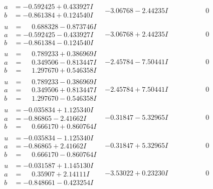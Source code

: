 \documentclass[1p]{elsarticle_modified}
\theoremstyle{definition}
\begin{document}
$$\begin{array}{c|c|c}
\begin{aligned}
a &= -0.592425 + 0.433927 I \\
b &= -0.861384 + 0.124540 I\end{aligned}
 & -3.06768 - 2.44235 I & \phantom{-0.000000 } 0 \\ \hline\begin{aligned}
u &= \phantom{-}0.688328 - 0.873746 I \\
a &= -0.592425 - 0.433927 I \\
b &= -0.861384 - 0.124540 I\end{aligned}
 & -3.06768 + 2.44235 I & \phantom{-0.000000 } 0 \\ \hline\begin{aligned}
u &= \phantom{-}0.789233 + 0.386969 I \\
a &= \phantom{-}0.349506 - 0.813447 I \\
b &= \phantom{-}1.297670 + 0.546358 I\end{aligned}
 & -2.45784 - 7.50441 I & \phantom{-0.000000 } 0 \\ \hline\begin{aligned}
u &= \phantom{-}0.789233 - 0.386969 I \\
a &= \phantom{-}0.349506 + 0.813447 I \\
b &= \phantom{-}1.297670 - 0.546358 I\end{aligned}
 & -2.45784 + 7.50441 I & \phantom{-0.000000 } 0 \\ \hline\begin{aligned}
u &= -0.035834 + 1.125340 I \\
a &= -0.86865 - 2.41662 I \\
b &= \phantom{-}0.666170 + 0.860764 I\end{aligned}
 & -0.31847 - 5.32965 I & \phantom{-0.000000 } 0 \\ \hline\begin{aligned}
u &= -0.035834 - 1.125340 I \\
a &= -0.86865 + 2.41662 I \\
b &= \phantom{-}0.666170 - 0.860764 I\end{aligned}
 & -0.31847 + 5.32965 I & \phantom{-0.000000 } 0 \\ \hline\begin{aligned}
u &= -0.031587 + 1.145130 I \\
a &= \phantom{-}0.35907 + 2.14111 I \\
b &= -0.848661 - 0.423254 I\end{aligned}
 & -3.53022 + 0.23230 I & \phantom{-0.000000 } 0 \\ \hline\begin{aligned}

\end{aligned}
\end{array}$$
\end{document}

